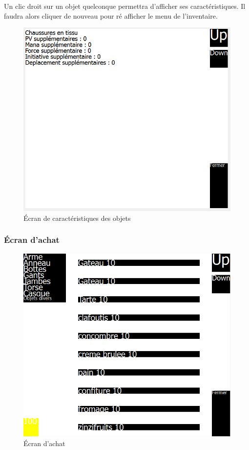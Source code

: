 \documentclass[11pt,a4paper]{article}
\begin{document}
Un clic droit sur un objet quelconque permettra d'afficher ses caractéristiques. Il faudra alors cliquer de nouveau pour ré afficher le menu de l'inventaire. 

\begin{figure}[h]
\begin{center}
\includegraphics[scale=0.5]{./ecran_carac_objet.png}
\caption{Écran de caractéristiques des objets}
\end{center}
\end{figure}

\subsubsection{Écran d'achat}

\begin{figure}[h]
\begin{center}
\includegraphics[scale=0.6]{./ecranAchat.png}
\caption{Écran d'achat}
\end{center}
\end{figure}
\end{document}
